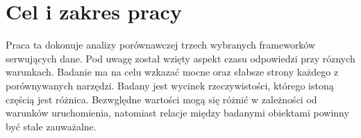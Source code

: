 \section{Cel i zakres pracy}

Praca ta dokonuje analizy porównawczej trzech wybranych frameworków serwujących dane.
Pod uwagę został wzięty aspekt czasu odpowiedzi przy róznych warunkach.
Badanie ma na celu wzkazać mocne oraz słabsze strony każdego z porównywanych narzędzi.
Badany jest wycinek rzeczywistości, którego istoną częścią jest różnica.
Bezwględne wartości mogą się różnić w zależności od warunków uruchomienia, natomiast relacje między badanymi obiektami powinny być stale zauważalne.